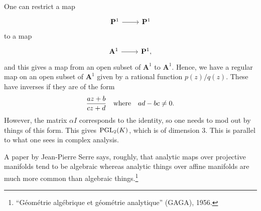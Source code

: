 \documentclass [11 pt, oneside] {article}
\begin{document}
\begin{example}\label{}
One can restrict a map 
\[
\begin{tikzcd}
\mathbf{P}^1\ar[r]& \mathbf{P}^1
\end{tikzcd}
\]
to a map 
\[
\begin{tikzcd}
\mathbf{A}^1\ar[r]& \mathbf{P}^1,
\end{tikzcd}
\]
and this gives a map from an open subset of $\mathbf{A}^1$ to $\mathbf{A}^1$. Hence, we have a regular map on an open subset of $\mathbf{A}^1$ given by a rational function $p(z)/q (z)$. These have inverses if they are of the form
\begin{align*}
	\frac{az+b}{cz+d}\textrm{\quad where\quad$ad - bc \ne 0$.}
\end{align*}
However, the matrix $\alpha I$ corresponds to the identity, so one needs to mod out by things of this form. This gives $\operatorname{PGL}_2(K)$, which is of dimension $3$. This is parallel to what one sees in complex analysis.
\end{example}

\begin{remark}
	A paper by Jean-Pierre Serre says, roughly, that analytic maps over projective manifolds tend to be algebraic whereas analytic things over affine manifolds are much more common than algebraic things.\footnote{``G\'eom\'etrie alg\'ebrique et g\'eom\'etrie analytique'' (GAGA), 1956.}
\end{remark}
\end{document}
